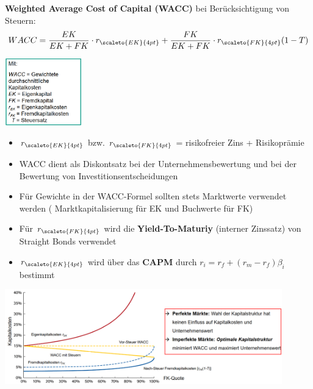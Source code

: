 \textbf{Weighted Average Cost of Capital (WACC)} bei Berücksichtigung von Steuern:
$$WACC=\frac{EK}{EK+FK}\cdot r_{\scaleto{EK}{4pt}}+\frac{FK}{EK+FK}\cdot r_{\scaleto{FK}{4pt}}(1-T)$$
\begin{center}
	\includegraphics[width=0.25\textwidth]{images/wacc.png}
\end{center}
\begin{itemize}
	\item $r_{\scaleto{EK}{4pt}}$ bzw. $r_{\scaleto{FK}{4pt}}$ = risikofreier Zins + Risikoprämie
	\item WACC dient als Diskontsatz bei der Unternehmensbewertung und bei der Bewertung von Investitionsentscheidungen
	\item Für Gewichte in der WACC-Formel sollten stets Marktwerte verwendet werden ( Marktkapitalisierung für EK und Buchwerte für FK)
	\item Für $r_{\scaleto{FK}{4pt}}$ wird die \textbf{Yield-To-Maturiy} (interner Zinssatz) von Straight Bonds verwendet
	\item $r_{\scaleto{EK}{4pt}}$ wird über das \textbf{CAPM} durch $r_i=r_f+(r_m-r_f)\beta_i$ bestimmt
\end{itemize}
\begin{center}
	\includegraphics[width=0.9\textwidth]{images/wacc-2.png}
\end{center}